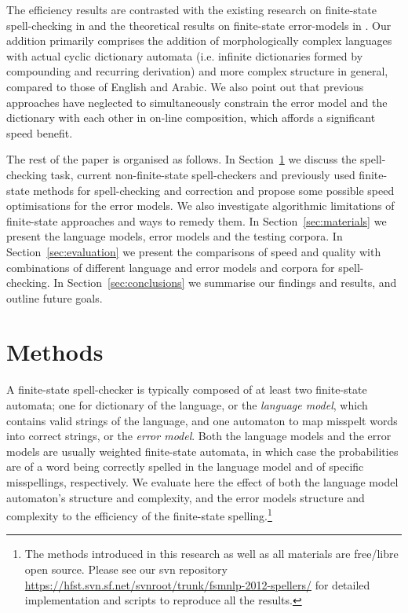 \documentclass[11pt]{article}
\begin{document}
The efficiency results are contrasted with the existing research on
finite-state spell-checking in  and the theoretical
results on finite-state error-models in .  Our addition
primarily comprises the addition of morphologically complex languages with
actual cyclic dictionary automata (i.e. infinite dictionaries formed by
compounding and recurring derivation) and more complex structure in general,
compared to those of English and Arabic. We also point out that previous
approaches have neglected to simultaneously constrain the error model and the
dictionary with each other in on-line composition, which affords a significant
speed benefit.

The rest of the paper is organised as follows. In Section~\ref{sec:methods} we
discuss the spell-checking task, current non-finite-state spell-checkers and
previously used finite-state methods for spell-checking and correction and
propose some possible speed optimisations for the error models.
We also investigate algorithmic limitations of finite-state approaches and
ways to remedy them. In
Section~\ref{sec:materials} we present the language models, error models and the
testing corpora. In Section~\ref{sec:evaluation} we
present the comparisons of speed and quality with combinations of different
language and error models and corpora for spell-checking. In
Section~\ref{sec:conclusions} we summarise our findings and results,
and outline future goals.


\section{Methods}
\label{sec:methods}

A finite-state spell-checker is typically composed of at least two finite-state
automata; one for dictionary of the language, or the \emph{language model},
which contains valid strings of the language, and one automaton to map misspelt
words into correct strings, or the \emph{error model}. Both the language models
and the error models are usually weighted finite-state automata, in which
case the probabilities are of a word being correctly spelled in the language
model and of specific misspellings, respectively.
We evaluate here the effect of both the language model automaton's structure
and complexity, and the error models structure and complexity to the efficiency
of the finite-state spelling.\footnote{The methods introduced in this research
as well as all materials are free/libre open source. Please see our svn
repository \url{https://hfst.svn.sf.net/svnroot/trunk/fsmnlp-2012-spellers/}
for detailed implementation and scripts to reproduce all the
results.}
\end{document}
